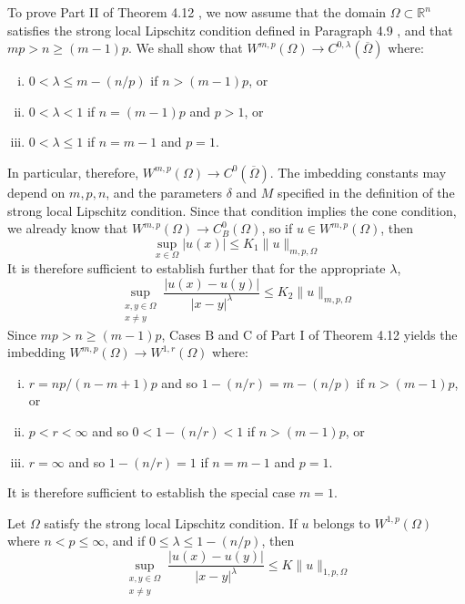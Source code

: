 \begin{para}
  To prove Part II of Theorem 4.12 , we now assume that the domain $\Omega \subset \mathbb{R}^n$ satisfies the strong local Lipschitz condition defined in Paragraph 4.9 , and that $m p>n \geq(m-1) p$. We shall show that $W^{m,p}(\Omega) \rightarrow C^{0, \lambda}(\overline{\Omega})$ where:
  \begin{enumerate}[(i)]
    \item $0<\lambda \leq m-(n / p)$ if $n>(m-1) p$, or
    \item $0<\lambda<1$ if $n=(m-1) p$ and $p>1$, or
    \item $0<\lambda \leq 1$ if $n=m-1$ and $p=1$.
  \end{enumerate}
  In particular, therefore, $W^{m,p}(\Omega) \rightarrow C^0(\overline{\Omega})$. The imbedding constants may depend on $m, p, n$, and the parameters $\delta$ and $M$ specified in the definition of the strong local Lipschitz condition. Since that condition implies the cone condition, we already know that $W^{m,p}(\Omega) \rightarrow C_B^0(\Omega)$, so if $u \in W^{m,p}(\Omega)$, then
  \[
  \sup _{x \in \Omega}|u(x)| \leq K_1\|u\|_{m, p, \Omega}
  \]
  It is therefore sufficient to establish further that for the appropriate $\lambda$,
  \[
  \sup _{\substack{x, y \in \Omega \\ x \neq y}} \frac{|u(x)-u(y)|}{|x-y|^\lambda} \leq K_2\|u\|_{m, p, \Omega}
  \]
  Since $m p>n \geq(m-1) p$, Cases $\mathrm{B}$ and $\mathrm{C}$ of Part I of Theorem 4.12 yields the imbedding $W^{m,p}(\Omega) \rightarrow W^{1, r}(\Omega)$ where:
  \begin{enumerate}[(i)]
    \item $r=n p /(n-m+1) p$ and so $1-(n / r)=m-(n / p)$ if $n>(m-1) p$, or
    \item $p<r<\infty$ and so $0<1-(n / r)<1$ if $n>(m-1) p$, or
    \item $r=\infty$ and so $1-(n / r)=1$ if $n=m-1$ and $p=1$.
  \end{enumerate}
  It is therefore sufficient to establish the special case $m=1$.
\end{para}


\begin{lemma}
  Let $\Omega$ satisfy the strong local Lipschitz condition. If $u$ belongs to $W^{1, p}(\Omega)$ where $n<p \leq \infty$, and if $0 \leq \lambda \leq 1-(n / p)$, then
  \[
  \sup _{\substack{x, y \in \Omega \\ x \neq y}} \frac{|u(x)-u(y)|}{|x-y|^\lambda} \leq K\|u\|_{1, p, \Omega}
  \]
\end{lemma}

